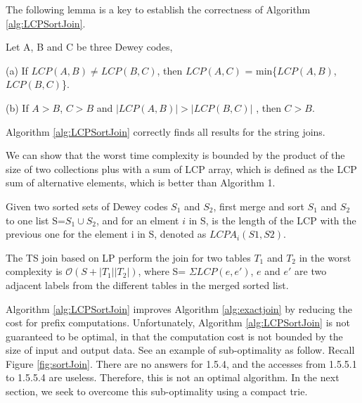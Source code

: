 The following lemma is a key to establish the correctness of Algorithm \ref{alg:LCPSortJoin}.

\begin{lem} Let A, B and C be three Dewey codes,

(a) If $LCP(A,B) \neq LCP(B,C)$,  then $LCP(A,C)$ = min\{$LCP(A,B)$, $LCP(B,C)$\}.

(b) If $A>B$, $C>B$ and $|LCP(A,B)|>|LCP(B,C)|$ , then $C>B$.
\label{lemma:LCPcomparison}
\end{lem}

\begin{theorem} Algorithm \ref{alg:LCPSortJoin} correctly finds all results for the string joins. \label{theorem:LCPSortCorrectness}
\end{theorem}


We can show that the worst time complexity is bounded by the product of the size of two collections plus with a sum of LCP array, which is defined as the LCP sum of alternative elements, which is better than Algorithm 1.



\begin{definition}  Given two sorted sets of Dewey codes $S_1$ and $S_2$, first merge and sort $S_1$ and $S_2$ to one list S=$S_1 \cup S_2$, and for an elment $i$ in S, is the length of the LCP with the previous one for the element i in S, denoted as $LCPA_i(S1,S2)$.
\end{definition}

\smallskip

\begin{theorem} The TS join based on LP perform the join for two tables $T_1$ and $T_2$ in the worst complexity is $\mathcal{O}$$(S+|T_1||T_2|)$, where S= $\Sigma LCP(e,e')$, $e$ and $e'$ are two adjacent labels from the different tables in the merged sorted list.
\end{theorem}

\smallskip

Algorithm \ref{alg:LCPSortJoin} improves Algorithm \ref{alg:exactjoin} by reducing the cost for prefix computations. Unfortunately, Algorithm \ref{alg:LCPSortJoin} is not guaranteed to be optimal, in that the computation cost is not bounded by the size of input and output data. See an example of sub-optimality as follow. Recall Figure \ref{fig:sortJoin}. There are no answers for 1.5.4, and the accesses from 1.5.5.1 to 1.5.5.4 are useless. Therefore, this is not an optimal algorithm. In the next section, we seek to overcome this sub-optimality using a compact trie.

